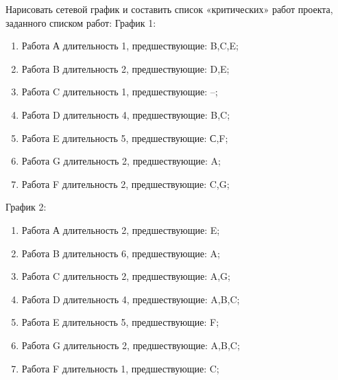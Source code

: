 \question
Нарисовать сетевой график и составить список «критических»
работ проекта, заданного списком работ:
График 1:
\begin{enumerate}
\item  Работа А длительность 1, предшествующие: B,C,E;
\item  Работа B длительность 2, предшествующие: D,E;
\item  Работа C длительность 1, предшествующие: --;
\item  Работа D длительность 4, предшествующие: B,C;
\item  Работа E длительность 5, предшествующие: С,F;
\item  Работа G длительность 2, предшествующие: A;
\item  Работа F длительность 2, предшествующие: C,G;
\end{enumerate}
График 2:
\begin{enumerate}
\item  Работа А длительность 2, предшествующие: E;
\item  Работа B длительность 6, предшествующие: A;
\item  Работа C длительность 2, предшествующие: A,G;
\item  Работа D длительность 4, предшествующие: A,B,C;
\item  Работа E длительность 5, предшествующие: F;
\item  Работа G длительность 2, предшествующие: A,B,C;
\item  Работа F длительность 1, предшествующие: C;
\end{enumerate}
